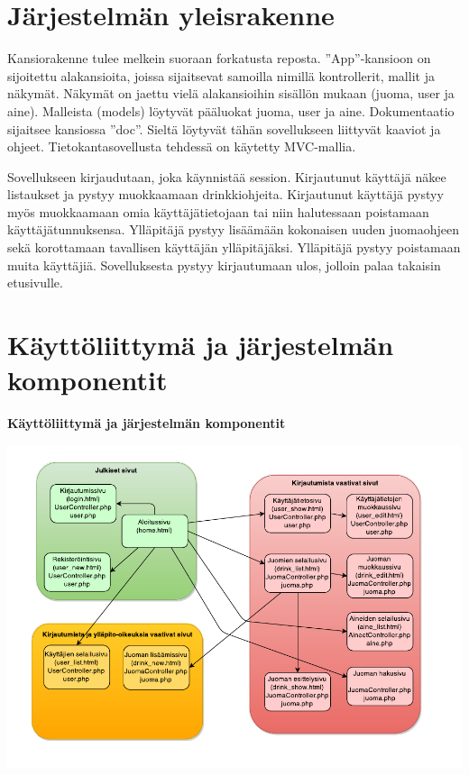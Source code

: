 \documentclass[a4paper]{article}
\begin{document}
\section{Järjestelmän yleisrakenne}

Kansiorakenne tulee melkein suoraan forkatusta reposta. ”App”-kansioon on sijoitettu alakansioita, 
joissa sijaitsevat samoilla nimillä kontrollerit, mallit ja näkymät. Näkymät on jaettu vielä alakansioihin 
sisällön mukaan (juoma, user ja aine). Malleista (models) löytyvät pääluokat juoma, user ja aine. Dokumentaatio 
sijaitsee kansiossa ”doc”. Sieltä löytyvät tähän sovellukseen liittyvät kaaviot ja ohjeet. Tietokantasovellusta
tehdessä on käytetty MVC-mallia. 

Sovellukseen kirjaudutaan, joka käynnistää session. Kirjautunut käyttäjä näkee listaukset ja pystyy muokkaamaan 
drinkkiohjeita. Kirjautunut käyttäjä pystyy myös muokkaamaan omia käyttäjätietojaan tai niin halutessaan poistamaan käyttäjätunnuksensa. Ylläpitäjä pystyy lisäämään kokonaisen uuden juomaohjeen sekä korottamaan tavallisen käyttäjän 
ylläpitäjäksi. Ylläpitäjä pystyy poistamaan muita käyttäjiä. Sovelluksesta pystyy kirjautumaan ulos, jolloin palaa takaisin etusivulle. 



\newpage
\section{Käyttöliittymä ja järjestelmän komponentit}
\begin{flushleft}\textbf{Käyttöliittymä ja järjestelmän komponentit} \end{flushleft}

\includegraphics[scale=0.8]{sivunakymat.pdf}
\end{document}
